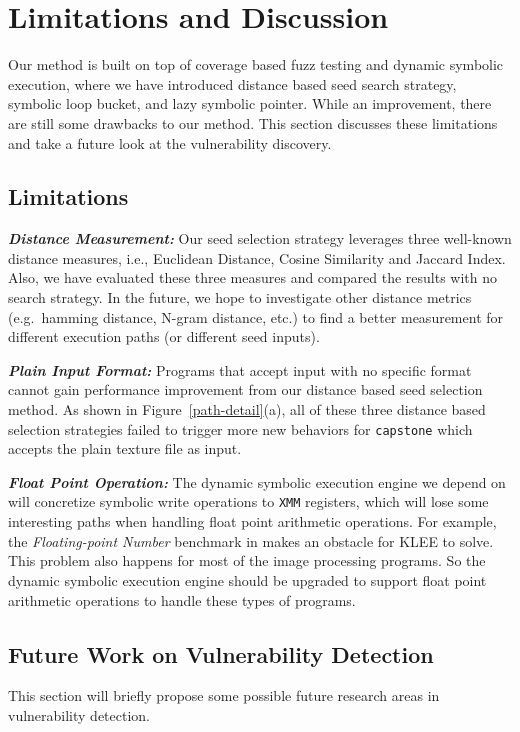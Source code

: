 \documentclass{cta-author}
\begin{document}
\section{Limitations and Discussion} \label{sec:discussion}
Our method is built on top of coverage based fuzz testing and dynamic 
symbolic execution, where we have introduced distance based seed search 
strategy, symbolic loop bucket, and lazy symbolic pointer. While an 
improvement, there are still some drawbacks to our method. This section 
discusses these limitations and take a future look at 
the vulnerability discovery.

\subsection{Limitations}

\noindent\textit{\textbf{Distance Measurement:}} Our seed selection 
strategy leverages three well-known distance measures, i.e., 
Euclidean Distance, Cosine Similarity and Jaccard Index. Also, 
we have evaluated these three measures and compared the results 
with no search strategy. In the future, we hope to investigate 
other distance metrics (e.g.\ hamming distance, N-gram distance, 
etc.) to find a better measurement for different execution paths 
(or different seed inputs). 

\noindent\textit{\textbf{Plain Input Format:}} Programs that accept 
input with no specific format cannot gain performance improvement 
from our distance based seed selection method. As shown in 
Figure~\ref{path-detail}(a), all of these three distance based 
selection strategies failed to trigger more new behaviors for 
\texttt{capstone} which accepts the plain texture file as input. 

\noindent\textit{\textbf{Float Point Operation:}} The dynamic 
symbolic execution engine we depend on will concretize symbolic 
write operations to \texttt{XMM} registers, which will lose some 
interesting paths when handling float point arithmetic operations. 
For example, the \emph{Floating-point Number} benchmark in \cite{xu2017benchmarking}
makes an obstacle for KLEE to solve.
This problem also happens for most of the image processing programs. 
So the dynamic symbolic execution engine should be upgraded to 
support float point arithmetic operations to handle 
these types of programs.

\subsection{Future Work on Vulnerability Detection}
This section will briefly propose some possible future 
research areas in vulnerability detection.
\end{document}
